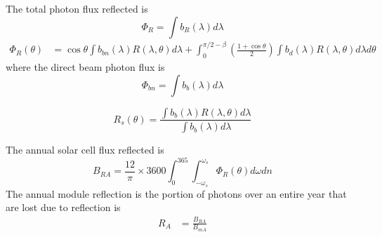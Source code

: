 \documentclass[preprint,12pt]{elsarticle}
\begin{document}
 
The total photon flux reflected is
\begin{equation}
\Phi_{R} = \int b_{R} (\lambda) d \lambda
\end{equation}
\begin{align}
\Phi_{R} (\theta) &= \cos \theta \int b_{bn} (\lambda) R(\lambda, \theta) d \lambda  +  \int_{0}^{\pi/2 - \beta} \left ( \frac{1 + \cos \theta}{2} \right ) \int b_d (\lambda) R(\lambda, \theta) d \lambda d \theta
\end{align}
where the direct beam photon flux is 
\begin{equation}
\Phi_{bn} = \int b_b (\lambda) d \lambda
\end{equation}




\begin{equation}
R_s (\theta) = \frac{ \int b_b (\lambda) R(\lambda, \theta) d \lambda }{ \int b_b (\lambda) d \lambda}
\end{equation}

The annual solar cell flux reflected is 
\begin{equation}
B_{RA} = \frac{12}{\pi} \times 3600 \int_{0}^{365} \int_{-\omega_s} ^{\omega_s} \Phi_{R} (\theta) d \omega d n 
\end{equation}
The annual module reflection is the portion of photons over an entire year that are lost due to 
reflection is 
\begin{align}
R_{A} &= \frac{B_{RA}}{B_{mA}} \\
\end{align}


\end{document}
